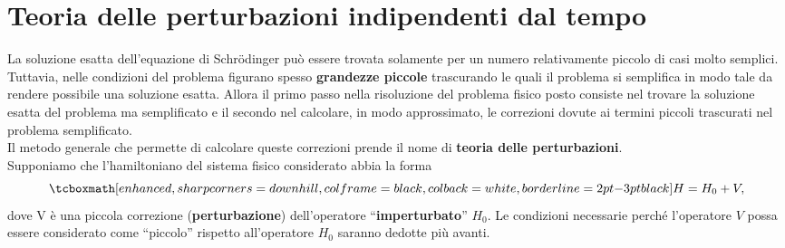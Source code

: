 \documentclass[a4paper,12pt,oneside]{book}
\newcommand*{\myfont}{\fontfamily{ppl}\selectfont}
\begin{document}
\fancypagestyle{plain}{%
\fancyhf{} %
\fancyfoot[C]{\bfseries \myfont{\thepage}} %
\renewcommand{\headrulewidth}{0pt}
\renewcommand{\footrulewidth}{0pt}}

\fancypagestyle{VS}{
\headheight = 15pt
\lhead[\myfont{\textit{\textbf{\thechapter\nouppercase{\leftmark}}}}]{\myfont{\textit{\textbf{\nouppercase{\leftmark}}}}}
\chead[]{}
\rhead[\myfont{\textbf{\thepage}}]{\myfont{\textbf{\thepage}}}

\lfoot[]{}
\cfoot[]{}
\rfoot[]{}
}



\pagestyle{VS}
\setcounter{chapter}{13}
\setcounter{page}{147}
\chapter[T.d.P. indipendenti dal tempo]{Teoria delle perturbazioni indipendenti dal tempo}
La soluzione esatta dell'equazione di Schr\"{o}dinger può essere trovata solamente per un numero relativamente piccolo di casi molto semplici.\\

Tuttavia, nelle condizioni del problema figurano spesso \textbf{grandezze piccole} trascurando le quali il problema si semplifica in modo tale da rendere possibile una soluzione esatta. Allora il primo passo nella risoluzione del problema fisico posto consiste nel trovare la soluzione esatta del problema ma semplificato e il secondo nel calcolare, in modo approssimato, le correzioni dovute ai termini piccoli trascurati nel problema semplificato.\\

Il metodo generale che permette di calcolare queste correzioni prende il nome di \textbf{teoria delle perturbazioni}.\\

Supponiamo che l'hamiltoniano del sistema fisico considerato abbia la forma
	\begin{equation}
		\tcboxmath[enhanced, sharp corners=downhill, colframe=black, colback=white, borderline={2pt}{-3pt}{black}]{
			H= H_0+ V,
			}
	\end{equation}
dove V è una piccola correzione (\textbf{perturbazione}) dell'operatore ``\textbf{imperturbato}'' $H_0$. Le condizioni necessarie perché l'operatore $V$ possa essere considerato come ``piccolo'' rispetto all'operatore $H_0$ saranno dedotte più avanti.\\
\end{document}
